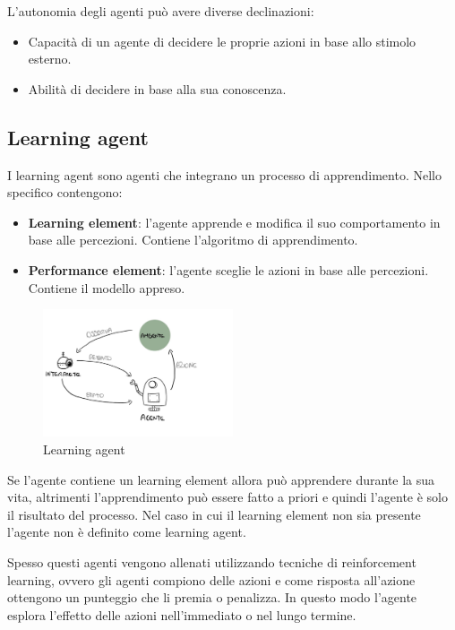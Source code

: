 L'autonomia degli agenti può avere diverse declinazioni:
\begin{itemize}
    \item Capacità di un agente di decidere le proprie azioni in base allo stimolo
          esterno.
    \item Abilità di decidere in base alla sua conoscenza.
\end{itemize}
\subsection{Learning agent}
I learning agent sono agenti che integrano un processo di apprendimento. Nello
specifico contengono:
\begin{itemize}
    \item \textbf{Learning element}: l'agente apprende e modifica il suo comportamento
          in base alle percezioni. Contiene l'algoritmo di apprendimento.
    \item \textbf{Performance element}: l'agente sceglie le azioni in base alle
          percezioni. Contiene il modello appreso.
\end{itemize}

\begin{figure}[!h]
    \centering
    \includegraphics[width=0.50\textwidth]{./img/Agenti/learning_agent.jpg}
    \caption{Learning agent}
    \label{fig:Learning_agent}
\end{figure}

Se l'agente contiene un learning element allora può apprendere durante la sua vita,
altrimenti l'apprendimento può essere fatto a priori e quindi l'agente è solo il
risultato del processo. Nel caso in cui il learning element non sia presente
l'agente non è definito come learning agent.

Spesso questi agenti vengono allenati utilizzando tecniche di reinforcement
learning, ovvero gli agenti compiono delle azioni e come risposta all'azione
ottengono un punteggio che li premia o penalizza. In questo modo l'agente esplora
l'effetto delle azioni nell'immediato o nel lungo termine.

